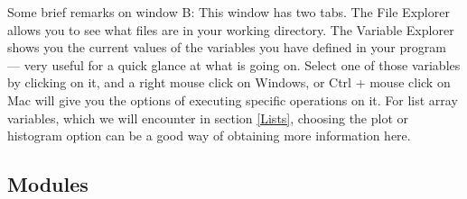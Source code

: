 \documentclass[twocolumn,apj]{openjournal}
\begin{document}
Some brief remarks on window B: This window has two tabs. The File Explorer allows you to see what files are in your working directory. The Variable Explorer shows you the current values of the variables you have defined in your program --- very useful for a quick glance at what is going on. Select one of those variables by clicking on it, and a right mouse click on Windows, or Ctrl + mouse click on Mac will give you the options of executing specific operations on it. For list array variables, which we will encounter in section \ref{Lists}, choosing the plot or histogram option can be a good way of obtaining more information here.

\subsection{Modules}
\label{PythonModules}
\end{document}
